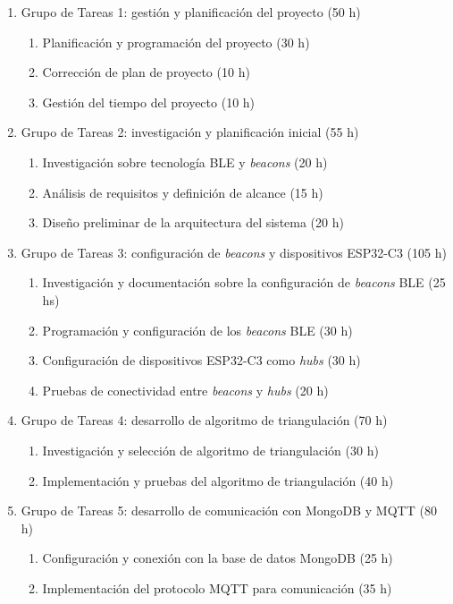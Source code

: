 \documentclass[
11pt, %
]{charter}
\begin{document}
\begin{enumerate}
\item Grupo de Tareas 1: gestión y planificación del proyecto (50 h)
	\begin{enumerate}
	\item Planificación y programación del proyecto (30 h)
	\item Corrección de plan de proyecto (10 h)
	\item Gestión del tiempo del proyecto (10 h)
	\end{enumerate}
\item Grupo de Tareas 2: investigación y planificación inicial (55 h)
	\begin{enumerate}
	\item Investigación sobre tecnología BLE y \textit{beacons} (20 h)
	\item Análisis de requisitos y definición de alcance (15 h)
	\item Diseño preliminar de la arquitectura del sistema (20 h)
	\end{enumerate}
\item Grupo de Tareas 3: configuración de \textit{beacons} y dispositivos ESP32-C3 (105 h)
	\begin{enumerate}
	\item Investigación y documentación sobre la configuración de \textit{beacons} BLE (25 hs)
	\item Programación y configuración de los \textit{beacons} BLE (30 h)
	\item Configuración de dispositivos ESP32-C3 como \textit{hubs} (30 h)
	\item Pruebas de conectividad entre \textit{beacons} y \textit{hubs} (20 h)
	\end{enumerate}
\item Grupo de Tareas 4: desarrollo de algoritmo de triangulación (70 h)
	\begin{enumerate}
	\item Investigación y selección de algoritmo de triangulación (30 h)
	\item Implementación y pruebas del algoritmo de triangulación (40 h)
	\end{enumerate}
\item Grupo de Tareas 5: desarrollo de comunicación con MongoDB y MQTT (80 h)
	\begin{enumerate}
	\item Configuración y conexión con la base de datos MongoDB (25 h)
	\item Implementación del protocolo MQTT para comunicación (35 h)

\end{enumerate}
\end{enumerate}
\end{document}
